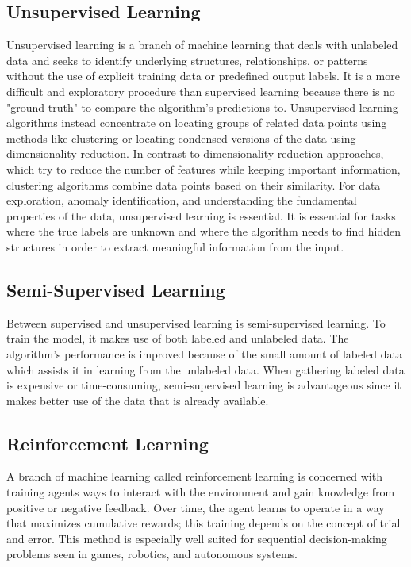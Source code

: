 \documentclass[a4paper,11pt]{report}%
\renewcommand{\\}{\vspace*{0.5\baselineskip} \newline}
\begin{document}
\subsection{Unsupervised Learning}
Unsupervised learning is a branch of machine learning that deals with unlabeled data and seeks to identify underlying structures, relationships, or patterns without the use of explicit training data or predefined output labels. It is a more difficult and exploratory procedure than supervised learning because there is no "ground truth" to compare the algorithm's predictions to. Unsupervised learning algorithms instead concentrate on locating groups of related data points using methods like clustering or locating condensed versions of the data using dimensionality reduction. In contrast to dimensionality reduction approaches, which try to reduce the number of features while keeping important information, clustering algorithms combine data points based on their similarity. For data exploration, anomaly identification, and understanding the fundamental properties of the data, unsupervised learning is essential. It is essential for tasks where the true labels are unknown and where the algorithm needs to find hidden structures in order to extract meaningful information from the input.

\subsection{Semi-Supervised Learning}
Between supervised and unsupervised learning is semi-supervised learning. To train the model, it makes use of both labeled and unlabeled data. The algorithm's performance is improved because of the small amount of labeled data which assists it in learning from the unlabeled data. When gathering labeled data is expensive or time-consuming, semi-supervised learning is advantageous since it makes better use of the data that is already available.

\subsection{Reinforcement Learning}
A branch of machine learning called reinforcement learning is concerned with training agents ways to interact with the environment and gain knowledge from positive or negative feedback. Over time, the agent learns to operate in a way that maximizes cumulative rewards; this training depends on the concept of trial and error. This method is especially well suited for sequential decision-making problems seen in games, robotics, and autonomous systems.
\end{document}
